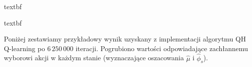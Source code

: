 \begin{table}[h!]
\centering
\caption{Wartości analityczne dla modelu zarządzania zapasami ($M=3$): $Q^{\mu^\star,\phi_s^\star}(s,a)$ (dyskontowanie quasi-hiperboliczne, $\alpha=0.35$, $\beta=0.95$) oraz $W^{\phi_s^\star}(s,a)$ (standardowe dyskontowanie $\beta=0.95$).}
\label{tab:inv_m3_analytic_wq}
\begin{minipage}[t]{0.49\textwidth}
\centering
\csname textbf\\
\vspace{2pt}
\end{minipage}
\hfill
\begin{minipage}[t]{0.49\textwidth}
\centering
\csname textbf\\
\vspace{2pt}
\end{minipage}
\end{table}

Poniżej zestawiamy przykładowy wynik uzyskany z implementacji algorytmu QH Q-learning po $6\,250\,000$ iteracji. Pogrubiono wartości odpowiadające zachłannemu wyborowi akcji w każdym stanie (wyznaczające oszacowania $\hat{\mu}$ i $\hat{\phi}_s$).

